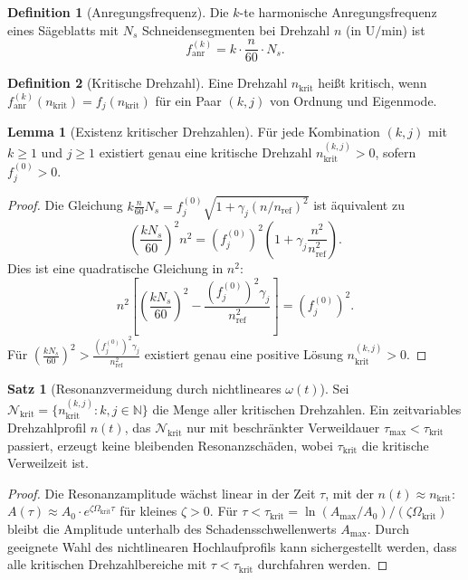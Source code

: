﻿\documentclass[a4paper,12pt]{article}
\theoremstyle{definition}
\newtheorem{definition}{Definition}
\newtheorem{satz}{Satz}
\newtheorem{lemma}{Lemma}
\begin{document}
\begin{definition}[Anregungsfrequenz]
Die $k$-te harmonische Anregungsfrequenz eines Sägeblatts mit $N_s$ Schneidensegmenten
bei Drehzahl $n$ (in $\mathrm{U/min}$) ist
\[
f_{\mathrm{anr}}^{(k)} = k \cdot \frac{n}{60} \cdot N_s.
\]
\end{definition}

\begin{definition}[Kritische Drehzahl]
Eine Drehzahl $n_{\mathrm{krit}}$ heißt kritisch, wenn $f_{\mathrm{anr}}^{(k)}(n_{\mathrm{krit}}) = f_j(n_{\mathrm{krit}})$
für ein Paar $(k, j)$ von Ordnung und Eigenmode.
\end{definition}

\begin{lemma}[Existenz kritischer Drehzahlen]
\label{lem:kritisch}
Für jede Kombination $(k, j)$ mit $k \geq 1$ und $j \geq 1$ existiert genau eine
kritische Drehzahl $n_{\mathrm{krit}}^{(k,j)} > 0$, sofern $f_j^{(0)} > 0$.
\end{lemma}

\begin{proof}
Die Gleichung $k \frac{n}{60} N_s = f_j^{(0)}\sqrt{1 + \gamma_j(n/n_{\mathrm{ref}})^2}$
ist äquivalent zu
\[
\left(\frac{kN_s}{60}\right)^2 n^2 = (f_j^{(0)})^2\left(1 + \gamma_j\frac{n^2}{n_{\mathrm{ref}}^2}\right).
\]
Dies ist eine quadratische Gleichung in $n^2$:
\[
n^2\left[\left(\frac{kN_s}{60}\right)^2 - \frac{(f_j^{(0)})^2\gamma_j}{n_{\mathrm{ref}}^2}\right] = (f_j^{(0)})^2.
\]
Für $\left(\frac{kN_s}{60}\right)^2 > \frac{(f_j^{(0)})^2\gamma_j}{n_{\mathrm{ref}}^2}$ existiert
genau eine positive Lösung $n_{\mathrm{krit}}^{(k,j)} > 0$.
\end{proof}

\begin{satz}[Resonanzvermeidung durch nichtlineares $\omega(t)$]
\label{satz:resonanzvermeidung}
Sei $\mathcal{N}_{\mathrm{krit}} = \{n_{\mathrm{krit}}^{(k,j)} : k,j \in \mathbb{N}\}$ die Menge aller
kritischen Drehzahlen. Ein zeitvariables Drehzahlprofil $n(t)$, das $\mathcal{N}_{\mathrm{krit}}$
nur mit beschränkter Verweildauer $\tau_{\max} < \tau_{\mathrm{krit}}$ passiert, erzeugt
keine bleibenden Resonanzschäden, wobei $\tau_{\mathrm{krit}}$ die kritische Verweilzeit ist.
\end{satz}

\begin{proof}
Die Resonanzamplitude wächst linear in der Zeit $\tau$, mit der $n(t) \approx n_{\mathrm{krit}}$:
$A(\tau) \approx A_0 \cdot e^{\zeta \Omega_{\mathrm{krit}} \tau}$ für kleines $\zeta > 0$.
Für $\tau < \tau_{\mathrm{krit}} = \ln(A_{\max}/A_0)/(\zeta\Omega_{\mathrm{krit}})$
bleibt die Amplitude unterhalb des Schadensschwellenwerts $A_{\max}$.
Durch geeignete Wahl des nichtlinearen Hochlaufprofils kann sichergestellt werden,
dass alle kritischen Drehzahlbereiche mit $\tau < \tau_{\mathrm{krit}}$ durchfahren werden.
\end{proof}
\end{document}
